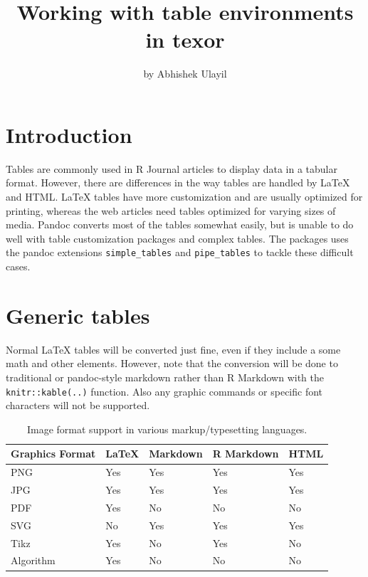 \title{Working with table environments in texor}
\author{by Abhishek Ulayil}

\maketitle


\section{Introduction}
Tables are commonly used in R Journal articles to display data in a tabular format. However, there are differences in the way tables are handled by LaTeX and HTML.
LaTeX tables have more customization and are usually optimized for printing, whereas the web articles need tables optimized for varying sizes of media.
Pandoc converts most of the tables somewhat easily, but is unable to do well with table customization packages and complex tables.
The  packages uses the pandoc extensions \verb|simple_tables| and \verb|pipe_tables| to tackle these difficult cases.

\section{Generic tables}
Normal LaTeX tables will be converted just fine, even if they include a some math and other elements.
However, note that the conversion will be done to traditional or pandoc-style markdown rather than R Markdown with the \verb|knitr::kable(..)| function. Also any graphic commands or specific font characters will
not be supported.
\begin{table}[htbp]
\centering
\begin{tabular}{l | llll }
 \hline
 Graphics Format & LaTeX & Markdown & R Markdown & HTML \\
 \hline
 PNG       & Yes & Yes & Yes & Yes \\
 JPG       & Yes & Yes & Yes & Yes \\
 PDF       & Yes & No & No & No \\
 SVG       & No & Yes & Yes & Yes \\
 Tikz      & Yes & No & Yes & No \\
 Algorithm & Yes & No & No & No \\
\hline
\end{tabular}
\caption{Image format support in various markup/typesetting languages.}
\label{table:1}
\end{table}

